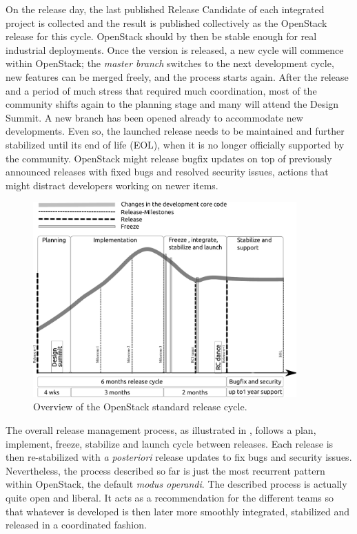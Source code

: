 \documentclass[dvipsnames]{interact}
\theoremstyle{plain}\newtheorem{theorem}{Theorem}[section]
\theoremstyle{definition}
\theoremstyle{remark}
\begin{document}
On the release day, the last published Release Candidate of each integrated project is collected and the result is published collectively as the OpenStack release for this cycle. OpenStack should by then be stable enough for real industrial deployments. Once the version is released, a new cycle will commence within OpenStack; the \emph{master branch} switches to the next development cycle, new features can be merged freely, and the process starts again. After the release and a period of much stress that required much coordination, most of the community shifts again to the planning stage and many will attend the Design Summit. A new branch has been opened already to accommodate new developments. Even so, the launched release needs to be maintained and further stabilized until its end of life (EOL), when it is no longer officially supported by the community. OpenStack might release bugfix updates on top of previously announced releases with fixed bugs and resolved security issues, actions that might distract developers working on newer items. 





\begin{figure}[!ht]
  \centering
  \includegraphics[keepaspectratio=true,width=0.9\textwidth]{release-management-overview.pdf}
  \caption{Overview of the OpenStack standard release cycle.}
 \label{fig:3stageprocesspic}
\end{figure}



The overall release management process, as illustrated in , follows a plan, implement, freeze, stabilize and launch cycle between releases. Each release is then re-stabilized with \emph{a posteriori} release updates to fix bugs and security issues. Nevertheless, the process described so far is just the most recurrent pattern within OpenStack, the default \emph{modus operandi}. The described process is actually quite open and liberal. It acts as a recommendation for the different teams so that whatever is developed is then later more smoothly integrated, stabilized and released in a coordinated fashion. 
\end{document}
